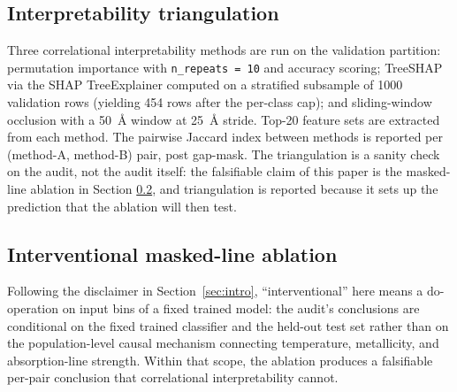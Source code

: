 \documentclass[11pt,a4paper]{article}
\begin{document}
\subsection{Interpretability triangulation}
\label{subsec:triangulation}

Three correlational interpretability methods are run on the validation partition: permutation importance with \texttt{n\_repeats = 10} and accuracy scoring; TreeSHAP via the SHAP TreeExplainer \citep{LundbergLee2017SHAP} computed on a stratified subsample of 1000 validation rows (yielding 454 rows after the per-class cap); and sliding-window occlusion with a 50~\AA{} window at 25~\AA{} stride. Top-20 feature sets are extracted from each method. The pairwise Jaccard index between methods is reported per (method-A, method-B) pair, post gap-mask. The triangulation is a sanity check on the audit, not the audit itself: the falsifiable claim of this paper is the masked-line ablation in Section \ref{subsec:ablation}, and triangulation is reported because it sets up the prediction that the ablation will then test.

\subsection{Interventional masked-line ablation}
\label{subsec:ablation}

Following the disclaimer in Section~\ref{sec:intro}, ``interventional'' here means a $\mathrm{do}$-operation on input bins of a fixed trained model: the audit's conclusions are conditional on the fixed trained classifier and the held-out test set rather than on the population-level causal mechanism connecting temperature, metallicity, and absorption-line strength. Within that scope, the ablation produces a falsifiable per-pair conclusion that correlational interpretability cannot.
\end{document}
